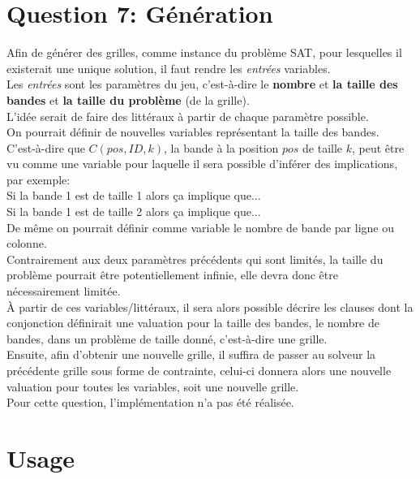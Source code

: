\documentclass[a4paper,12pt]{report}
\begin{document}
\chapter{Question 7: Génération}
Afin de générer des grilles, comme instance du problème SAT, pour lesquelles il existerait une unique solution, il faut rendre les \textit{entrées} variables.\\
Les \textit{entrées} sont les paramètres du jeu, c'est-à-dire le \textbf{nombre} et \textbf{la taille des bandes} et \textbf{la taille du problème} (de la grille).\\

L'idée serait de faire des littéraux à partir de chaque paramètre possible.\\ 

On pourrait définir de nouvelles variables représentant la taille des bandes.\\ 
C'est-à-dire que $C(pos,ID,k)$, la bande à la position $pos$ de taille $k$, peut être vu comme une variable pour laquelle il sera possible d'inférer des implications, par exemple:\\ Si la bande 1 est de taille 1 alors ça implique que...\\
Si la bande 1 est de taille 2 alors ça implique que...\\

De même on pourrait définir comme variable le nombre de bande par ligne ou colonne.\\

Contrairement aux deux paramètres précédents qui sont limités, la taille du problème pourrait être potentiellement infinie, elle devra donc être nécessairement limitée.\\

À partir de ces variables/littéraux, il sera alors possible décrire les clauses dont la conjonction définirait une valuation pour la taille des bandes, le nombre de bandes, dans un problème de taille donné, c'est-à-dire une grille.\\


Ensuite, afin d'obtenir une nouvelle grille, il suffira de passer au solveur la précédente grille sous forme de contrainte, celui-ci donnera alors une nouvelle valuation pour toutes les variables, soit une nouvelle grille.\\

Pour cette question, l'implémentation n'a pas été réalisée.

\chapter{Usage}
\end{document}
